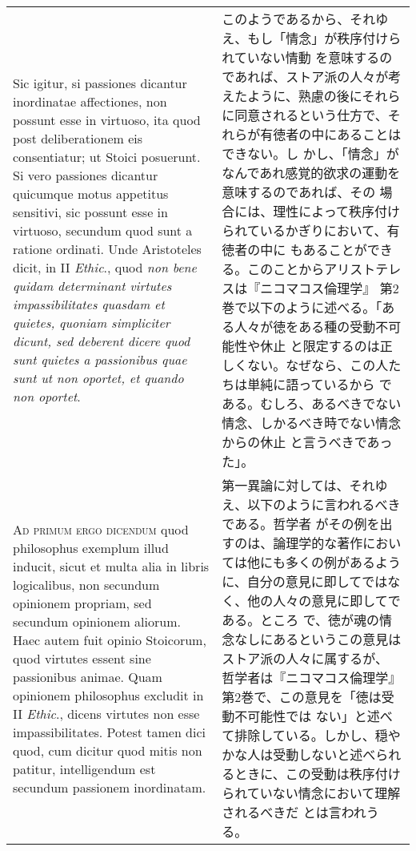 \documentclass[10pt]{jsarticle}
\begin{document}
\begin{longtable}{p{21em}p{21em}}
\\


 Sic igitur, si passiones dicantur inordinatae affectiones, non
 possunt esse in virtuoso, ita quod post deliberationem eis
 consentiatur; ut Stoici posuerunt. Si vero passiones dicantur
 quicumque motus appetitus sensitivi, sic possunt esse in virtuoso,
 secundum quod sunt a ratione ordinati. Unde Aristoteles dicit, in II
 {\itshape Ethic}., quod {\itshape non bene quidam determinant
 virtutes impassibilitates quasdam et quietes, quoniam simpliciter
 dicunt, sed deberent dicere quod sunt quietes a passionibus quae sunt
 ut non oportet, et quando non oportet}.


&

 このようであるから、それゆえ、もし「情念」が秩序付けられていない情動
 を意味するのであれば、ストア派の人々が考えたように、熟慮の後にそれら
 に同意されるという仕方で、それらが有徳者の中にあることはできない。し
 かし、「情念」がなんであれ感覚的欲求の運動を意味するのであれば、その
 場合には、理性によって秩序付けられているかぎりにおいて、有徳者の中に
 もあることができる。このことからアリストテレスは『ニコマコス倫理学』
 第2巻で以下のように述べる。「ある人々が徳をある種の受動不可能性や休止
 と限定するのは正しくない。なぜなら、この人たちは単純に語っているから
 である。むしろ、あるべきでない情念、しかるべき時でない情念からの休止
 と言うべきであった」。
 
\\

{\scshape Ad primum ergo dicendum} quod philosophus exemplum illud
inducit, sicut et multa alia in libris logicalibus, non secundum
opinionem propriam, sed secundum opinionem aliorum. Haec autem fuit
opinio Stoicorum, quod virtutes essent sine passionibus animae. Quam
opinionem philosophus excludit in II {\itshape Ethic}., dicens
virtutes non esse impassibilitates. Potest tamen dici quod, cum
dicitur quod mitis non patitur, intelligendum est secundum passionem
inordinatam.

&

 第一異論に対しては、それゆえ、以下のように言われるべきである。哲学者
 がその例を出すのは、論理学的な著作においては他にも多くの例があるよう
 に、自分の意見に即してではなく、他の人々の意見に即してである。ところ
 で、徳が魂の情念なしにあるというこの意見はストア派の人々に属するが、
 哲学者は『ニコマコス倫理学』第2巻で、この意見を「徳は受動不可能性では
 ない」と述べて排除している。しかし、穏やかな人は受動しないと述べられ
 るときに、この受動は秩序付けられていない情念において理解されるべきだ
 とは言われうる。
  

\end{longtable}
\end{document}
